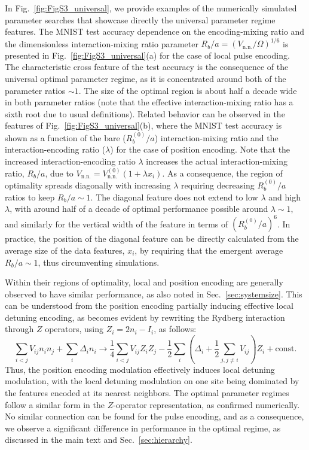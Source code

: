 \documentclass[english,floatfix,twocolumn,showpacs, aps, prx, reprint, superscriptaddress, longbibliography]{revtex4-2}
\begin{document}
In Fig.~\ref{fig:FigS3_universal}, we provide examples of the numerically simulated parameter searches that showcase directly the universal parameter regime features. The MNIST test accuracy dependence on the encoding-mixing ratio and the dimensionless interaction-mixing ratio parameter $R_{b}/a=(V_{\mathrm{n.n.}}/\Omega)^{1/6}$ is presented in Fig.~\ref{fig:FigS3_universal}(a) for the case of local pulse encoding. The characteristic cross feature of the test accuracy is the consequence of the universal optimal parameter regime, as it is concentrated around both of the parameter ratios $\sim 1$. The size of the optimal region is about half a decade wide in both parameter ratios (note that the effective interaction-mixing ratio has a sixth root due to usual definitions). Related behavior can be observed in the features of Fig.~\ref{fig:FigS3_universal}(b), where the MNIST test accuracy is shown as a function of the bare ($R_{b}^{(0)}/a$) interaction-mixing ratio and the interaction-encoding ratio ($\lambda$) for the case of position encoding. Note that the increased interaction-encoding ratio $\lambda$ increases the actual interaction-mixing ratio, $R_{b}/a$, due to $V_{\mathrm{n.n.}}=V^{(0)}_{\mathrm{n.n.}}(1+\lambda x_i)$. As a consequence, the region of optimality spreads diagonally with increasing $\lambda$ requiring decreasing $R_{b}^{(0)}/a$ ratios to keep $R_{b}/a \sim 1$. The diagonal feature does not extend to low $\lambda$ and high $\lambda$, with around half of a decade of optimal performance possible around $\lambda \sim 1$, and similarly for the vertical width of the feature in terms of $(R_{b}^{(0)}/a)^6$. In practice, the position of the diagonal feature can be directly calculated from the average size of the data features, $x_i$, by requiring that the emergent average $R_{b}/a \sim 1$, thus circumventing simulations. 

Within their regions of optimality, local and position encoding are generally observed to have similar performance, as also noted in Sec.~\ref{sec:systemsize}. This can be understood from the position encoding partially inducing effective local detuning encoding, as becomes evident by rewriting the Rydberg interaction through $Z$ operators, using $Z_i=2n_i-I_i$, as follows:
\begin{equation}\label{eq:encconnection}
    \sum_{i<j }V_{ij} n_i n_j + \sum_{i}\Delta_i n_i \rightarrow \frac{1}{4}\sum_{i< j }V_{ij} Z_i Z_j - \frac{1}{2}\sum_{i}\left(\Delta_i+\frac{1}{2}\sum_{j, j\neq i}V_{ij}  \right)Z_i + \mathrm{const}.
\end{equation}
Thus, the position encoding modulation effectively induces local detuning modulation, with the local detuning modulation on one site being dominated by the features encoded at its nearest neighbors. The optimal parameter regimes follow a similar form in the $Z$-operator representation, as confirmed numerically. No similar connection can be found for the pulse encoding, and as a consequence, we observe a significant difference in performance in the optimal regime, as discussed in the main text and Sec.~\ref{sec:hierarchy}.
\end{document}
